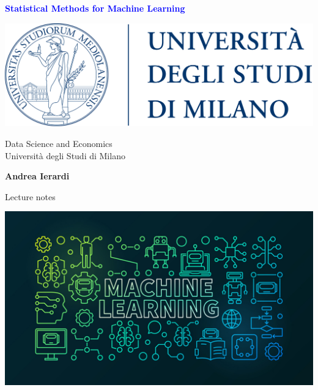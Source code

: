 \documentclass[a4paper,12pt]{report}
\newcommand\col[2]{\textcolor{#2}{#1}}
\begin{document}
\begin{titlepage}
    \begin{center}
        \vspace*{0.1cm}
            
        \Huge
        \textbf{\col{Statistical Methods for Machine Learning}{Blue}}        \vspace{0.5cm}

 \includegraphics[width=.5\linewidth]{unimi}
            
        \vspace{0.5cm}
        \LARGE
        Data Science and Economics \\
                    Università degli Studi di Milano\\
                            \vspace{0.5cm}


        \vspace{1.5cm}
            
        \textbf{Andrea Ierardi}
            
        \vfill
            
        Lecture notes
            
        \vspace{1cm}
            
 \includegraphics[width=0.9\linewidth]{front}
                        
    \end{center}
\end{titlepage}


\newpage
\tableofcontents
\listoffigures
\end{document}
